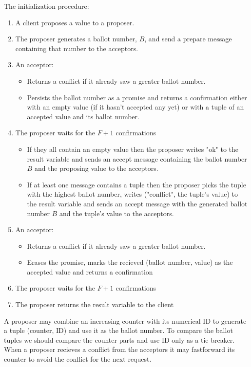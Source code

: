 \documentclass[12pt]{article}
\begin{document}
The initialization procedure:
\begin{enumerate}
  \item A client proposes a value to a proposer.
  \item The proposer generates a ballot number, $B$, and send a prepare message containing that number to the acceptors.
  \item An acceptor:
  \begin{itemize}
    \item Returns a conflict if it already saw a greater ballot number.
    \item Persists the ballot number as a promise and returns a confirmation either with an empty value (if it hasn't accepted any yet) or with a tuple of an accepted value and its ballot number.
  \end{itemize}
  \item The proposer waits for the $F+1$ confirmations
  \begin{itemize}
    \item If they all contain an empty value then the proposer writes "ok" to the result variable and sends an accept message containing the ballot number $B$ and the proposing value to the acceptors.
    \item If at least one message contains a tuple then the proposer picks the tuple with the highest ballot number, writes ("conflict", the tuple's value) to the result variable and sends an accept message with the generated ballot number $B$ and the tuple's value to the acceptors.
  \end{itemize}
  \item An acceptor:
  \begin{itemize}
    \item Returns a conflict if it already saw a greater ballot number.
    \item Erases the promise, marks the recieved (ballot number, value) as the accepted value and returns a confirmation
  \end{itemize}
  \item The proposer waits for the $F+1$ confirmations
  \item The proposer returns the result variable to the client
\end{enumerate}

A proposer may combine an increasing counter with its numerical ID to generate a tuple (counter, ID) and use it as the ballot number. To compare the ballot tuples we should compare the counter parts and use ID only as a tie breaker. When a proposer recieves a conflict from the acceptors it may fastforward its counter to avoid the conflict for the next request.
\end{document}
